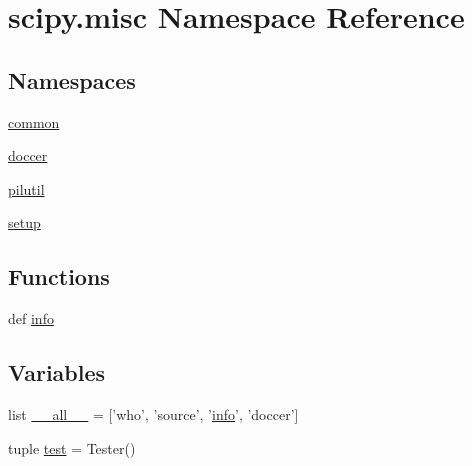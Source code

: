 \hypertarget{namespacescipy_1_1misc}{}\section{scipy.\+misc Namespace Reference}
\label{namespacescipy_1_1misc}
\subsection*{Namespaces}
\begin{DoxyCompactItemize}
\item 
 \hyperlink{namespacescipy_1_1misc_1_1common}{common}
\item 
 \hyperlink{namespacescipy_1_1misc_1_1doccer}{doccer}
\item 
 \hyperlink{namespacescipy_1_1misc_1_1pilutil}{pilutil}
\item 
 \hyperlink{namespacescipy_1_1misc_1_1setup}{setup}
\end{DoxyCompactItemize}
\subsection*{Functions}
\begin{DoxyCompactItemize}
\item 
def \hyperlink{namespacescipy_1_1misc_a9df72954626c50a4d50324a3497a8b95}{info}
\end{DoxyCompactItemize}
\subsection*{Variables}
\begin{DoxyCompactItemize}
\item 
list \hyperlink{namespacescipy_1_1misc_a6aecc429c8e40542d00cf5677ae15521}{\+\_\+\+\_\+all\+\_\+\+\_\+} = \mbox{[}'who', 'source', '\hyperlink{namespacescipy_1_1misc_a9df72954626c50a4d50324a3497a8b95}{info}', 'doccer'\mbox{]}
\item 
tuple \hyperlink{namespacescipy_1_1misc_a21545251e17588983d91eb63e3b9d306}{test} = Tester()
\end{DoxyCompactItemize}


